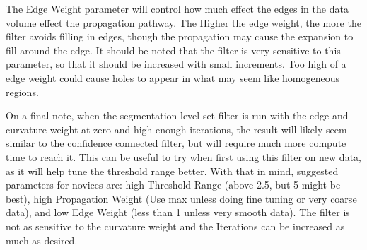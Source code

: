 \documentclass[fleqn,11pt,openany]{book}
\begin{document}
The Edge Weight parameter will control how much effect the edges in the data volume effect the propagation pathway.  The Higher the edge weight, the more the filter avoids filling in edges, though the propagation may cause the expansion to fill around the edge.  It should be noted that the filter is very sensitive to this parameter, so that it should be increased with small increments.  Too high of a edge weight could cause holes to appear in what may seem like homogeneous regions.  

On a final note, when the segmentation level set filter is run with the edge and curvature weight at zero and high enough iterations, the result will likely seem similar to the confidence connected filter, but will require much more compute time to reach it.  This can be useful to try when first using this filter on new data, as it will help tune the threshold range better.  With that in mind, suggested parameters for novices are: high Threshold Range (above 2.5, but 5 might be best), high Propagation Weight (Use max unless doing fine tuning or very coarse data), and low Edge Weight (less than 1 unless very smooth data).  The filter is not as sensitive to the curvature weight and the Iterations can be increased as much as desired.  
\end{document}
